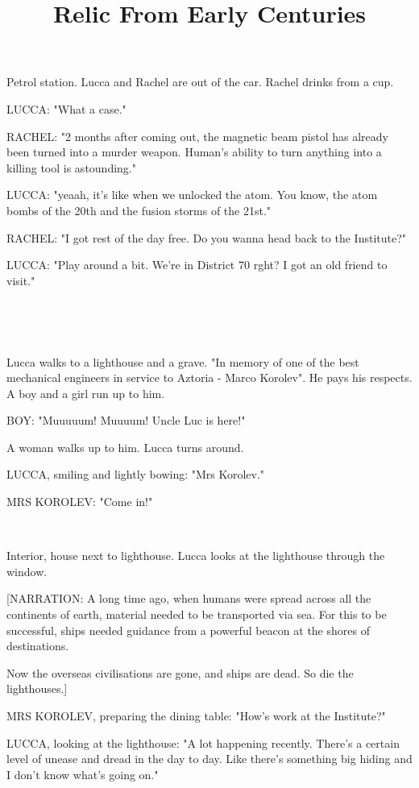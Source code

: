 \documentclass[11pt]{article}
\begin{document}
\ttfamily
\title{Relic From Early Centuries}
\maketitle


Petrol station. 
Lucca and Rachel are out of the car.
Rachel drinks from a cup.

LUCCA: "What a case."

RACHEL: "2 months after coming out, the magnetic beam pistol has already been turned into a murder weapon. 
Human's ability to turn anything into a killing tool is astounding."

LUCCA: "yeaah, it's like when we unlocked the atom.
You know, the atom bombs of the 20th and the fusion storms of the 21st."

RACHEL: "I got rest of the day free. 
Do you wanna head back to the Institute?"

LUCCA: "Play around a bit.
We're in District 70 rght? 
I got an old friend to visit."

\ 

\ 

Lucca walks to a lighthouse and a grave.
"In memory of one of the best mechanical engineers in service to Aztoria - Marco Korolev".
He pays his respects. 
A boy and a girl run up to him.

BOY: "Muuuuum! Muuuum! Uncle Luc is here!"

A woman walks up to him.
Lucca turns around.

LUCCA, smiling and lightly bowing: "Mrs Korolev."

MRS KOROLEV: "Come in!"

\ 

Interior, house next to lighthouse.
Lucca looks at the lighthouse through the window.

[NARRATION: A long time ago, when humans were spread across all the continents of earth, material needed to be transported via sea. 
For this to be successful, ships needed guidance from a powerful beacon at the shores of destinations.

Now the overseas civilisations are gone, and ships are dead. So die the lighthouses.]

MRS KOROLEV, preparing the dining table: "How's work at the Institute?"

LUCCA, looking at the lighthouse: "A lot happening recently. 
There's a certain level of unease and dread in the day to day.
Like there's something big hiding and I don't know what's going on."
\end{document}
